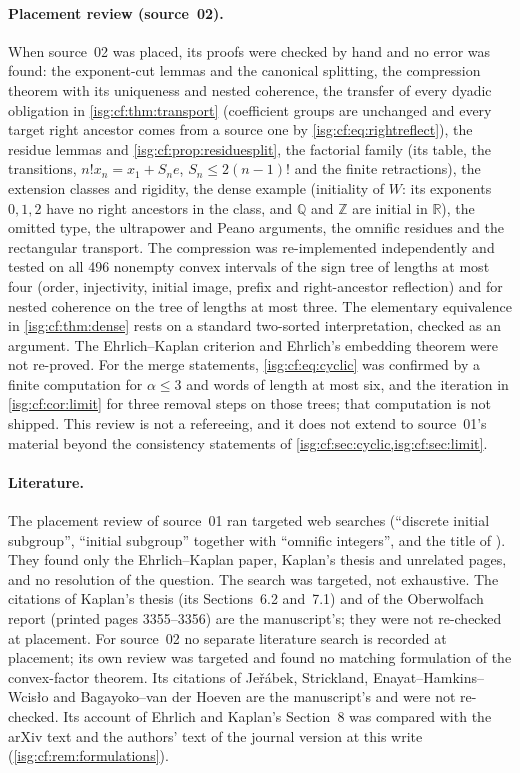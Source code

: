 \documentclass[11pt]{article}
\theoremstyle{definition}
\theoremstyle{remark}
\newcommand{\R}{\mathbb{R}}
\newcommand{\Z}{\mathbb{Z}}
\newcommand{\Q}{\mathbb{Q}}
\begin{document}
\paragraph{Placement review (source~02).} When source~02 was placed, its
proofs were checked by hand and no error was found: the exponent-cut
lemmas and the canonical splitting, the compression theorem with its
uniqueness and nested coherence, the transfer of every dyadic obligation
in \cref{isg:cf:thm:transport} (coefficient groups are unchanged and
every target right ancestor comes from a source one by
\eqref{isg:cf:eq:rightreflect}), the residue lemmas and
\cref{isg:cf:prop:residuesplit}, the factorial family (its table, the
transitions, $n!x_n=x_1+S_ne$, $S_n\le2(n-1)!$ and the finite
retractions), the extension classes and rigidity, the dense example
(initiality of $W$: its exponents $0,1,2$ have no right ancestors in the
class, and $\Q$ and $\Z$ are initial in $\R$), the omitted type, the
ultrapower and Peano arguments, the omnific residues and the rectangular
transport. The compression was re-implemented independently and tested
on all 496 nonempty convex intervals of the sign tree of lengths at most
four (order, injectivity, initial image, prefix and right-ancestor
reflection) and for nested coherence on the tree of lengths at most
three. The elementary equivalence in \cref{isg:cf:thm:dense} rests on a
standard two-sorted interpretation, checked as an argument. The
Ehrlich--Kaplan criterion and Ehrlich's embedding theorem were not
re-proved. For the merge statements, \eqref{isg:cf:eq:cyclic} was
confirmed by a finite computation for $\alpha\le3$ and words of length at
most six, and the iteration in \cref{isg:cf:cor:limit} for three removal
steps on those trees; that computation is not shipped. This review is not
a refereeing, and it does not extend to source~01's material beyond the
consistency statements of \cref{isg:cf:sec:cyclic,isg:cf:sec:limit}.

\paragraph{Literature.} The placement review of source~01 ran targeted web
searches (``discrete initial subgroup'', ``initial subgroup'' together
with ``omnific integers'', and the title of \cite{EK}). They found only
the Ehrlich--Kaplan paper, Kaplan's thesis and unrelated pages, and no
resolution of the question. The search was targeted, not exhaustive. The
citations of Kaplan's thesis (its Sections~6.2 and~7.1) and of the
Oberwolfach report (printed pages 3355--3356) are the manuscript's; they
were not re-checked at placement. For source~02 no separate literature
search is recorded at placement; its own review was targeted and found no
matching formulation of the convex-factor theorem. Its citations of
Je\v r\'abek, Strickland, Enayat--Hamkins--Wcis\l o and Bagayoko--van der
Hoeven are the manuscript's and were not re-checked. Its account of
Ehrlich and Kaplan's Section~8 was compared with the arXiv text and the
authors' text of the journal version at this write
(\cref{isg:cf:rem:formulations}).
\end{document}
